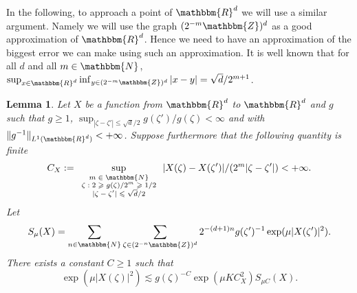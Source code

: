 \documentclass[a4paper,11pt]{article}
\newcommand{\assign}{:=}
\newcommand{\tmscript}[1]{\text{\scriptsize{$#1$}}}
\newtheorem{lemma}[theorem]{Lemma}
\begin{document}
In the following, to approach a point of $\mathbbm{R}^{d}$ we will use a
similar argument. Namely we will use the graph $( 2^{-m} \mathbbm{Z} )^{d}$ as
a good approximation of $\mathbbm{R}^{d}$. Hence we need to have an
approximation of the biggest error we can make using such an approximation. It
is well known that for all $d$ and all $m \in \mathbbm{N}$, $\sup_{x \in
\mathbbm{R}^{d}} \inf_{y \in ( 2^{-m} \mathbbm{Z} )^{d}} | x-y | = \sqrt{d}
/2^{m+1}$.

\begin{lemma}
  \label{lemma_chaining_space}Let $X$ be a function from $\mathbbm{R}^{d}$ to
  $\mathbbm{R}^{d}$ and $g$ such that $g \geqslant 1$, $\sup_{| \zeta - \zeta'
  | \leqslant \sqrt{d} /2} g ( \zeta' ) /g ( \zeta ) < \infty$ and with $\|
  g^{-1} \|_{L^{1} ( \mathbbm{R}^{d} )} <+ \infty$. Suppose furthermore that
  the following quantity is finite
  \[ C_{X} \assign \sup_{\tmscript{\begin{array}{c}
       m \in \mathbbm{N}\\
       \zeta : 2 \geqslant g ( \zeta ) /2^{m} \geqslant 1/2\\
       | \zeta - \zeta' | \leqslant \sqrt{d} /2
     \end{array}}} | X ( \zeta ) -X ( \zeta' ) | / ( 2^{m} | \zeta - \zeta' |
     ) <+ \infty . \]
  Let
  \[ S_{\mu} ( X ) = \sum_{n \in \mathbbm{N}} \sum_{\zeta \in ( 2^{-n}
     \mathbbm{Z} )^{d}} 2^{- ( d+1 ) n} g ( \zeta' )^{-1} \exp ( \mu | X (
     \zeta' ) |^{2} ) . \]
  There exists a constant $C \geqslant 1$ such that
  \[ \exp ( \mu | X ( \zeta ) |^{2} ) \lesssim g ( \zeta )^{-C} \exp ( \mu K
     C_{X}^{2} ) S_{\mu C} ( X ) . \]
\end{lemma}
\end{document}
